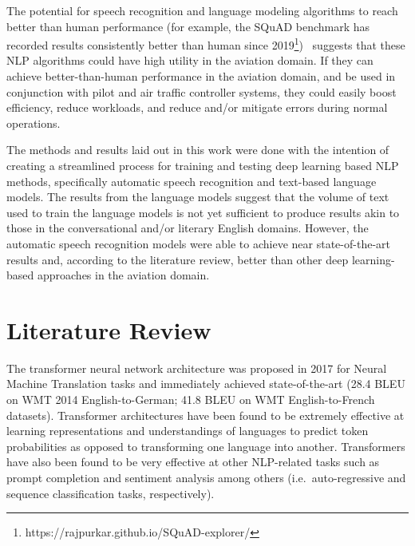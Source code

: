 \documentclass[12pt]{article}
\begin{document}
The potential for speech recognition and language modeling algorithms to reach better than human performance (for example, the SQuAD benchmark has
recorded results consistently better than human since 2019\footnote{https://rajpurkar.github.io/SQuAD-explorer/})~\cite{zhang_ai_2022} suggests that
these NLP algorithms could have high utility in the aviation domain. If they can achieve better-than-human performance in the aviation domain, and be
used in conjunction with pilot and air traffic controller systems, they could easily boost efficiency, reduce workloads, and reduce and/or mitigate
errors during normal operations.

The methods and results laid out in this work were done with the intention of creating a streamlined process for training and testing deep learning
based NLP methods, specifically automatic speech recognition and text-based language models. The results from the language models suggest that the
volume of text used to train the language models is not yet sufficient to produce results akin to those in the conversational and/or literary English
domains. However, the automatic speech recognition models were able to achieve near state-of-the-art results and, according to the literature review,
better than other deep learning-based approaches in the aviation domain.

\section{Literature Review}\label{sec:lit_review}
The transformer neural network architecture was proposed in 2017 for Neural Machine Translation tasks and immediately achieved
state-of-the-art (28.4 BLEU on WMT 2014 English-to-German; 41.8 BLEU on WMT English-to-French datasets)\cite{vaswani_attention_2017}. Transformer
architectures have been found to be extremely effective at learning representations and understandings of languages to predict token probabilities as
opposed to transforming one language into another\cite{devlin_bert_2019,liu_roberta_2019}. Transformers have also been found to be very effective at
other NLP-related tasks such as prompt completion and sentiment analysis among others (i.e.~auto-regressive and sequence classification tasks,
respectively)\cite{lewis_bart_2019,radford_improving_2018}.
\end{document}
